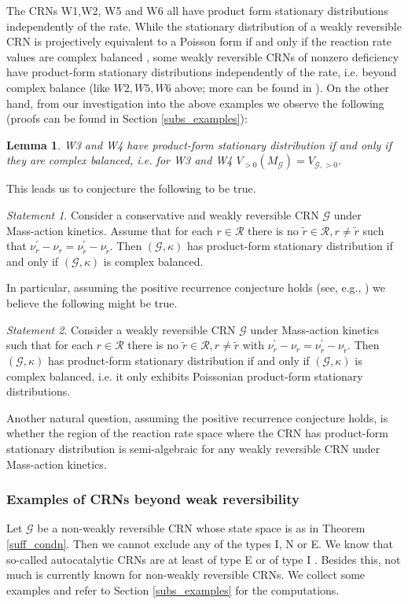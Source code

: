 \documentclass{amsart}
\newtheorem{lemma}[theorem]{Lemma}
\theoremstyle{definition}
\theoremstyle{remark}
\theoremstyle{Conjecture/open problem}
\theoremstyle{assumption}
\theoremstyle{conjecture}
\newtheorem{conjecture}{Statement}
\def\p{^{\prime}}
\def\k{\kappa}
\def\cG{\mathcal{G}}
\def\cR{\mathcal{R}}
\numberwithin{equation}{section}
\begin{document}
The CRNs W1,W2, W5 and W6 all have product form stationary distributions independently of the rate. While the stationary distribution of a weakly reversible CRN is projectively equivalent to a Poisson form if and only if the reaction rate values are complex balanced \cite{Cappelletti}, some weakly reversible CRNs of nonzero deficiency have product-form stationary distributions independently of the rate, i.e. beyond complex balance (like $W2,W5,W6$ above; more can be found in \cite{hoesslyuni}). 
On the other hand, from our investigation into the above examples we observe the following (proofs can be found in Section \ref{subs_examples}):
\begin{lemma}
W3 and W4 have product-form stationary distribution if and only if they are complex balanced, i.e. for W3 and W4 $V_{>0}(M_\cG)= V_{\cG,>0}$.
\end{lemma}

This leads us to conjecture the following to be true.
\begin{conjecture}
Consider a conservative and weakly reversible CRN $\cG$ under\\ Mass-action kinetics. Assume that for each $r\in\cR$ there is no $\tilde{r}\in\cR,r\neq \tilde{r}$ such that $\nu _r\p-\nu _r=\nu _{\tilde{r}}\p-\nu _{\tilde{r}}$. Then $(\cG,\k)$ has product-form stationary distribution if and only if $(\cG,\k)$ is complex balanced.
\end{conjecture}
In particular, assuming the positive recurrence conjecture holds (see, e.g., \cite{andersonpos}) we believe the following might be true.
\begin{conjecture}
Consider a weakly reversible CRN $\cG$ under Mass-action kinetics such that for each $r\in\cR$ there is no $\tilde{r}\in\cR,r\neq \tilde{r}$ with $\nu _r\p-\nu _r=\nu _{\tilde{r}}\p-\nu _{\tilde{r}}$. Then $(\cG,\k)$ has product-form stationary distribution if and only if $(\cG,\k)$ is complex balanced, i.e. it only exhibits Poissonian product-form stationary distributions.
\end{conjecture}
Another natural question, assuming the positive recurrence conjecture holds, is \\whether the region of the reaction rate space where the CRN has product-form stationary distribution is semi-algebraic for any weakly reversible CRN under Mass-action kinetics.

\subsubsection{Examples of CRNs beyond weak reversibility}\hfill\break
Let $\cG$ be a non-weakly reversible CRN whose state space is as in Theorem \ref{suff_condn}. Then we cannot exclude any of the types I, N or E. We know that so-called autocatalytic CRNs are at least of type E or of type I \cite{hoesslysta}. Besides this, not much is currently known for non-weakly reversible CRNs. We collect some examples and refer to Section \ref{subs_examples} for the computations.
\end{document}
